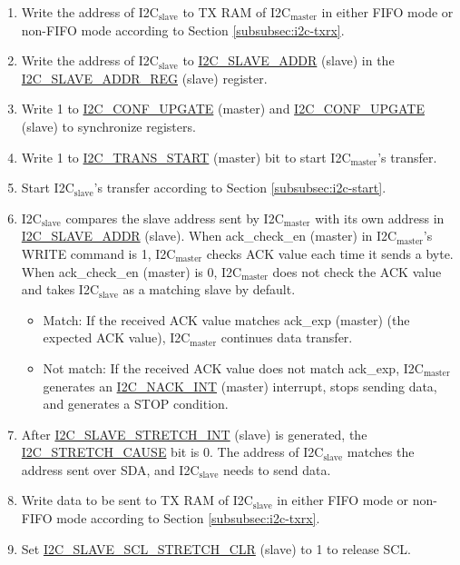 \documentclass[main\_\_EN.tex]{subfiles}
\begin{document}
\begin{enumerate}
\begin{longtable}{ | p{5cm} | p{1.5cm} | p{1.5cm} | p{1.5cm} |p{2.5cm} | p{1.5cm}|}
\end{longtable}
\item Write the address of I2C$_\text{slave}$ to TX RAM of I2C$_\text{master}$ in either FIFO mode or non-FIFO mode according to Section \ref{subsubsec:i2c-txrx}.
\item Write the address of I2C$_\text{slave}$ to \hyperref[fielddesc:I2CSLAVEADDR]{I2C\_SLAVE\_ADDR} (slave) in the \hyperref[regdesc:I2CSLAVEADDRREG]{I2C\_SLAVE\_ADDR\_REG} (slave) register.
\item Write 1 to \hyperref[fielddesc:I2CCONFUPGATE]{I2C\_CONF\_UPGATE} (master) and \hyperref[fielddesc:I2CCONFUPGATE]{I2C\_CONF\_UPGATE} (slave) to synchronize registers.
\item Write 1 to \hyperref[fielddesc:I2CTRANSSTART]{I2C\_TRANS\_START} (master) bit to start I2C$_\text{master}$'s transfer.
\item Start I2C$_\text{slave}$'s transfer according to Section \ref{subsubsec:i2c-start}.
\item I2C$_\text{slave}$ compares the slave address sent by I2C$_\text{master}$ with its own address in \hyperref[fielddesc:I2CSLAVEADDR]{I2C\_SLAVE\_ADDR} (slave). When ack\_check\_en (master) in I2C$_\text{master}$'s WRITE command is 1, I2C$_\text{master}$ checks ACK value each time it sends a byte. When ack\_check\_en (master) is 0, I2C$_\text{master}$ does not check the ACK value and takes I2C$_\text{slave}$ as a matching slave by default.
\begin{itemize}
\item Match: If the received ACK value matches ack\_exp (master) (the expected ACK value), I2C$_\text{master}$ continues data transfer.
\item Not match: If the received ACK value does not match ack\_exp, I2C$_\text{master}$ generates an \hyperref[int:i2c-nack]{I2C\_NACK\_INT} (master) interrupt, stops sending data, and generates a STOP condition.
\end{itemize}

\item After \hyperref[int:i2c-slave-stretch]{I2C\_SLAVE\_STRETCH\_INT} (slave) is generated, the \hyperref[fielddesc:I2CSTRETCHCAUSE]{I2C\_STRETCH\_CAUSE} bit is 0. The address of I2C$_\text{slave}$ matches the address sent over SDA, and I2C$_\text{slave}$ needs to send data.
\item Write data to be sent to TX RAM of I2C$_\text{slave}$ in either FIFO mode or non-FIFO mode according to Section \ref{subsubsec:i2c-txrx}.
\item Set \hyperref[fielddesc:I2CSLAVESCLSTRETCHCLR]{I2C\_SLAVE\_SCL\_STRETCH\_CLR} (slave) to 1 to release SCL.


\end{enumerate}
\end{document}
